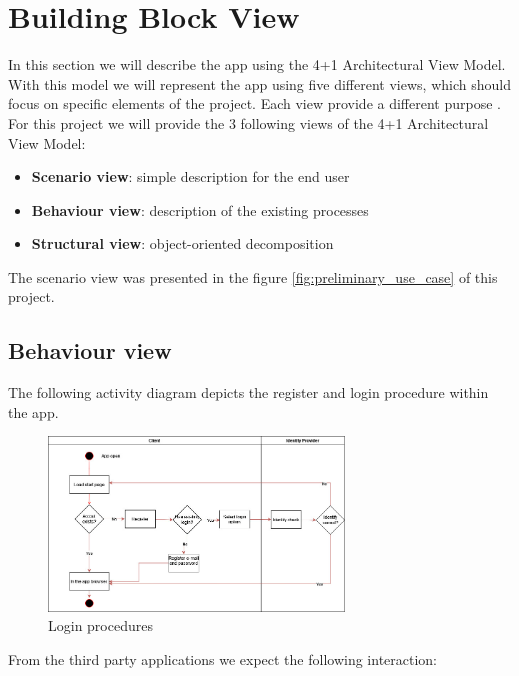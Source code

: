 \section{Building Block View}

In this section we will describe the \gls{app} using the 4+1 Architectural View Model. With this model we will represent
the \gls{app} using five different views, which should focus on specific elements of the project. Each view provide
a different purpose \cite{refart:KR41}. For this project we will provide the 3 following views of the 4+1 Architectural View 
Model:

\begin{itemize}
    \item \textbf{Scenario view}: simple description for the end user 
    \item \textbf{Behaviour view}: description of the existing processes
    \item \textbf{Structural view}: object-oriented decomposition
\end{itemize}

The scenario view was presented in the figure \ref{fig:preliminary_use_case} of this project.

\subsection{Behaviour view}
The following \gls{activity diagram} depicts the register and login procedure within the app.

\begin{figure}[H]
    \centering
    \includegraphics[width=0.7\textwidth]{assets/login_AC.jpg}
    \caption{Login procedures}
    \label{fig:login_register}
\end{figure}


From the third party applications we expect the following interaction:




